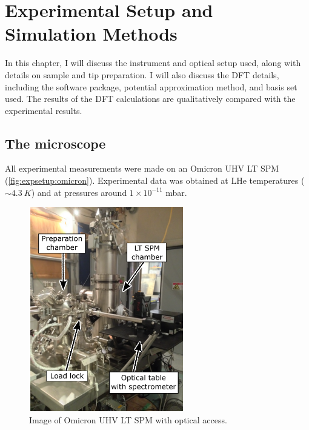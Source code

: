 
\chapter{Experimental Setup and Simulation Methods}
\label{ch:expsetup}

In this chapter, I will discuss the instrument and optical setup used, along with details on sample and tip preparation. I will also discuss the \ac{DFT} details, including the software package, potential approximation method, and basis set used. The results of the \ac{DFT} calculations are qualitatively compared with the experimental results.


\section{The microscope}

All experimental measurements were made on an Omicron \ac{UHV} \ac{LT} \ac{SPM} (\autoref{fig:expsetup:omicron}). Experimental data was obtained at \ac{LHe} temperatures ($\sim \SI{4.3}{K}$) and at pressures around $1 \times 10^{-11}$ mbar. 

\begin{figure} [h]
    \centering
    \includegraphics[width=0.6\textwidth]{pictures/microscope_labelled.png}
    \caption{Image of Omicron UHV LT SPM with optical access.}
    \label{fig:expsetup:omicron}
\end{figure}

